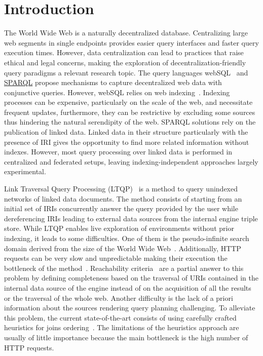 \section{Introduction}

The World Wide Web is a naturally decentralized database.
Centralizing large web segments in single endpoints provides easier query interfaces and faster query execution times.
However, data centralization can lead to practices that raise ethical and legal concerns, making the exploration of decentralization-friendly query paradigms a relevant research topic.
The query languages webSQL~\cite{Mendelzon1996} and \href{https://www.w3.org/TR/sparql11-query/}{SPARQL} propose mechanisms to capture decentralized web data with conjunctive queries.
However, webSQL relies on web indexing~\cite{Mendelzon1996}.
Indexing processes can be expensive, particularly on the scale of the web, and necessitate frequent updates, furthermore, they can be restrictive by excluding some sources thus hindering the natural serendipity of the web.
SPARQL solutions rely on the publication of linked data.
Linked data in their structure particularly with the presence of IRI gives the opportunity to find more related information without indexes.
However, most query processing over linked data is performed in centralized and federated setups, leaving indexing-independent approaches largely experimental.

Link Traversal Query Processing (LTQP)~\cite{Hartig2012} is a method to query unindexed networks of linked data documents.
The method consists of starting from an initial set of IRIs concurrently answer the query provided by the user while dereferencing IRIs leading to external data sources from the internal engine triple store.
While LTQP enables live exploration of environments without prior indexing, it leads to some difficulties.
One of them is the pseudo-infinite search domain derived from the size of the World Wide Web~\cite{hartig2016walking}.
Additionally, HTTP requests can be very slow and unpredictable making their execution the bottleneck of the method~\cite{hartig2016walking}.
Reachability criteria~\cite{Hartig2012} are a partial answer to this problem by defining completeness based on the traversal of URIs
contained in the internal data source of the engine instead of on the acquisition of all the results or the traversal of the whole web.
Another difficulty is the lack of a priori information about the sources rendering query planning challenging.
To alleviate this problem, the current state-of-the-art consists of using carefully crafted heuristics for joins ordering~\cite{Hartig2011}.
The limitations of the heuristics approach are usually of little importance because the main bottleneck is the high number of HTTP requests.

